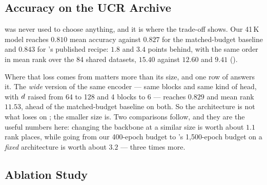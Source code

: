 \subsection{Accuracy on the UCR Archive}
\label{sec:res:ucr}

\ucr{} was never used to choose anything, and it is where the trade-off shows. Our 41\,K model
reaches $0.810$ mean accuracy against $0.827$ for the matched-budget baseline and $0.843$ for
\millet{}'s published recipe: $1.8$ and $3.4$ points behind, with the same order in mean rank over
the 84 shared datasets, $15.40$ against $12.60$ and $9.41$ ().

Where that loss comes from matters more than its size, and one row of  answers it. The
\emph{wide} version of the same encoder --- same blocks and same kind of head, with $d$ raised
from 64 to 128 and 4 blocks to 6 --- reaches $0.829$ and mean rank $11.53$, ahead of the
matched-budget baseline on both. So the architecture is not what loses on \ucr{}; the smaller size is.
Two comparisons follow, and they are the useful numbers here: changing the backbone at a similar size
is worth about $1.1$ rank places, while going from our 400-epoch budget to \millet{}'s 1{,}500-epoch
budget on a \emph{fixed} architecture is worth about $3.2$ --- three times more.

\subsection{Ablation Study}
\label{sec:res:ablation}

